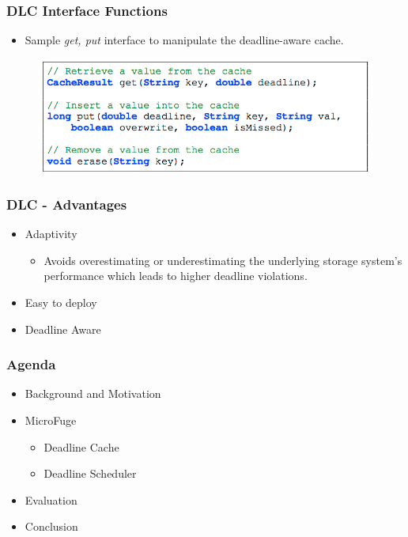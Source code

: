 \documentclass{beamer}
\begin{document}
\begin{frame}
  \frametitle{DLC Interface Functions}
  \begin{itemize}
  \item Sample \textit{get, put} interface to manipulate the deadline-aware cache.
  \end{itemize}
  \begin{figure}
    \begin{center}
      \centerline{\includegraphics[scale=0.45]{img/DLC_interface.png}}
    \end{center}
  \end{figure}
\end{frame}

\begin{frame}
  \frametitle{DLC - Advantages}
  \begin{itemize}
  \item Adaptivity
    \begin{itemize}
      \item Avoids overestimating or underestimating the underlying storage
        system's performance which leads to higher deadline violations.
    \end{itemize}
  \item Easy to deploy
  \item Deadline Aware
  \end{itemize}
\end{frame}

\begin{frame}
  \frametitle{Agenda}
  \begin{itemize}
  \item[\Checkmark] Background and Motivation
  \item[\Checkmark] MicroFuge
    \begin{itemize}
    \item[\Checkmark] Deadline Cache
    \item Deadline Scheduler
    \end{itemize}
  \item Evaluation
  \item Conclusion
  \end{itemize}
\end{frame}
\end{document}
